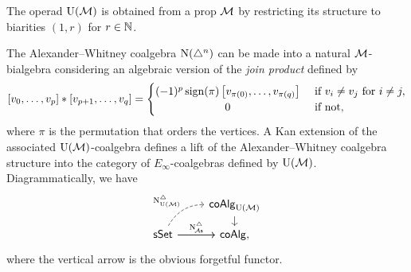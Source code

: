 \begin{remark*}
	The operad ${\operatorname{U}(\mathcal{M})}$ is obtained from a prop $\mathcal{M}$ by restricting its structure to biarities $(1,r)$ for $r \in \mathbb{N}$.
\end{remark*}

\begin{example}\label{ex:simplicial e-infty}
	The Alexander--Whitney coalgebra $\operatorname{N}(\triangle^n)$ can be made into a natural $\mathcal{M}$-bialgebra considering an algebraic version of the \textit{join product} defined by
	\begin{equation*}
		\left[v_0, \dots, v_p \right] \ast \left[v_{p+1}, \dots, v_q\right] =
		\begin{cases} (-1)^{p} \sign(\pi) \left[v_{\pi(0)}, \dots, v_{\pi(q)}\right] &
			\text{ if } v_i \neq v_j \text{ for } i \neq j, \\
			\hfil 0 & \text{ if not},
		\end{cases}
	\end{equation*}
	where $\pi$ is the permutation that orders the vertices.
	A Kan extension of the associated ${\operatorname{U}(\mathcal{M})}$-coalgebra defines a lift of the Alexander--Whitney coalgebra structure into the category of $E_\infty$-coalgebras defined by ${\operatorname{U}(\mathcal{M})}$.
	Diagrammatically, we have
	\begin{equation*}
		\begin{tikzcd}[column sep=normal, row sep=small]
			& \coAlg_{\UM} \arrow[d] \\
			\sSet \arrow[r]
			\arrow[ur,out=60, in=180, dashed, "\schainsUM"]
			\arrow[r, "\schainsA"]
			& \coAlg,
		\end{tikzcd}
	\end{equation*}
	where the vertical arrow is the obvious forgetful functor.
\end{example}

